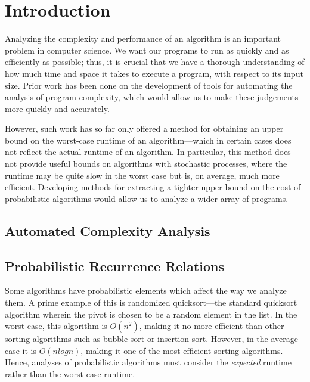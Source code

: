 \section{Introduction}
Analyzing the complexity and performance of an algorithm is an important problem in computer science. We want our programs to run as quickly and as efficiently as possible; thus, it is crucial that we have a thorough understanding of how much time and space it takes to execute a program, with respect to its input size. Prior work has been done on the development of tools
for automating the analysis of program complexity, which would allow us to make these judgements more quickly and accurately. 

However, such work has so far only offered a method for obtaining an upper bound on the worst-case runtime of an algorithm---which in certain cases does not reflect the actual runtime of an algorithm. In particular, this method does not
provide useful bounds on algorithms with stochastic processes, where the runtime may be quite slow in the worst case but
is, on average, much more efficient. Developing methods for extracting a tighter upper-bound on the cost of probabilistic algorithms would allow us to analyze a wider array of programs.

\subsection{Automated Complexity Analysis}

\subsection{Probabilistic Recurrence Relations}

Some algorithms have probabilistic elements which affect the way we analyze them. A prime example of this is randomized 
quicksort---the standard quicksort algorithm wherein the pivot is chosen to be a random element in the list. In the worst case,
this algorithm is $O(n^2)$, making it no more efficient than other sorting algorithms such as bubble sort or insertion sort. 
However, in the average case it is $O(nlogn)$, making it one of the most efficient sorting algorithms. Hence, analyses of probabilistic algorithms must consider the \emph{expected} runtime rather than the worst-case runtime. 

